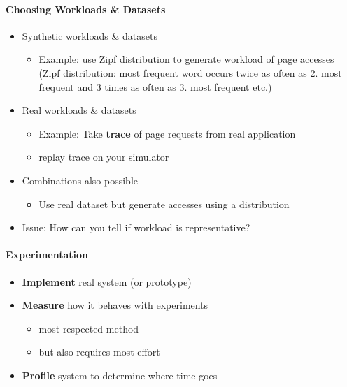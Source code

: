 \paragraph{Choosing Workloads \& Datasets}
\begin{itemize}
\item Synthetic workloads \& datasets
  \begin{itemize}
  \item Example: use Zipf distribution to generate workload
    of page accesses (Zipf distribution: most frequent word occurs
    twice as often as 2. most frequent and 3 times as often as 3. most
    frequent etc.)
  \end{itemize}

\item Real workloads \& datasets
  \begin{itemize}
  \item Example: Take \textbf{trace} of page requests from
    real application
  \item replay trace on your simulator
  \end{itemize}

\item Combinations also possible
  \begin{itemize}
  \item Use real dataset but generate accesses using a distribution
  \end{itemize}

\item Issue: How can you tell if workload is representative?
\end{itemize}


\paragraph{Experimentation}
\begin{itemize}
\item \textbf{Implement} real system (or prototype)
\item \textbf{Measure} how it behaves with experiments
  \begin{itemize}
  \item most respected method
  \item but also requires most effort
  \end{itemize}

\item \textbf{Profile} system to determine where time goes
\end{itemize}

